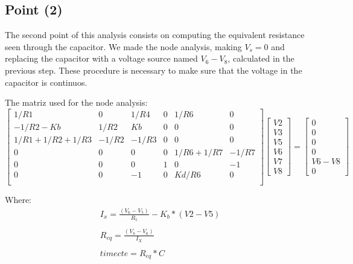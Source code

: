 \subsection{Point (2)} 

The second point of this analysis consists on computing the equivalent resistance seen through the capacitor. We made the node analysis, making $V_s=0$ and replacing the capacitor with a voltage source named $V_6-V_8$, calculated in the previous step.
These procedure is necessary to make sure that the voltage in the capacitor is continuos.   

The matriz used for the node analysis:
$$
\begin{bmatrix} 
   1/R1           & 0       & 1/R4    & 0    & 1/R6         & 0       \\
  -1/R2-Kb        & 1/R2    & Kb      & 0    & 0            & 0       \\
   1/R1+1/R2+1/R3 & -1/R2   & -1/R3   & 0    & 0            & 0       \\
   0              & 0       & 0       & 0    & 1/R6 + 1/R7  & -1/R7   \\
   0              & 0       & 0       & 1    & 0            & -1      \\
   0              & 0       & -1      & 0    & Kd/R6        & 0       \\
\end {bmatrix} 
\begin{bmatrix}
V2 \\ V3 \\ V5 \\ V6 \\ V7 \\ V8
\end {bmatrix} 
=
\begin{bmatrix} 
0 \\ 0 \\ 0 \\ 0 \\ V6-V8 \\ 0
\end {bmatrix} 
$$ 

Where: 
\begin{align*} 
&I_x=\frac{(V_6-V_5)}{R_5} - K_b*(V2-V5)\\
\\    
&R_{eq}=\frac{(V_8-V_6)}{I_X}\\
\\
&timecte=R_{eq}*C\\
\end{align*}


